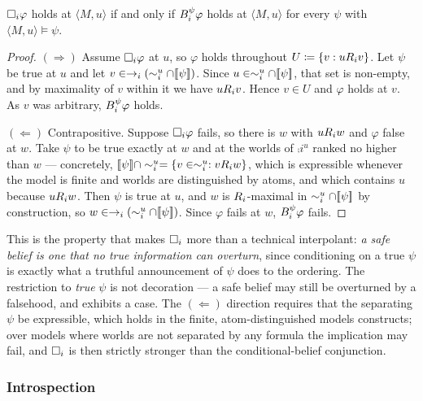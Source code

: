 \documentclass[11pt,a4paper]{article}
\begin{document}
\begin{proposition}
\label{prop:defeasible}
$\Box_{i}\varphi$ holds at $\langle M,u\rangle$ if and only if $B^{\psi}_{i}\varphi$ holds
at $\langle M,u\rangle$ for every $\psi$ with $\langle M,u\rangle \models \psi$.
\end{proposition}

\begin{proof}
$(\Rightarrow)$ Assume $\Box_{i}\varphi$ at $u$, so $\varphi$ holds throughout $U \coloneqq
\{v : u R_{i} v\}$. Let $\psi$ be true at $u$ and let $v \in
\rightarrow_{i}(\sim_{i}^{u} \cap [\![ \psi ]\!])$. Since $u \in \sim_{i}^{u} \cap [\![ \psi ]\!]$,
that set is non-empty, and by maximality of $v$ within it we have $u R_{i} v$. Hence $v
\in U$ and $\varphi$ holds at $v$. As $v$ was arbitrary, $B^{\psi}_{i}\varphi$ holds.

$(\Leftarrow)$ Contrapositive. Suppose $\Box_{i}\varphi$ fails, so there is $w$ with $u
R_{i} w$ and $\varphi$ false at $w$. Take $\psi$ to be true exactly at $w$ and at the
worlds of $\comp{i}^{u}$ ranked no higher than $w$ --- concretely, $[\![ \psi ]\!] \cap
\sim_{i}^{u} = \{v \in \sim_{i}^{u} : v R_{i} w\}$, which is expressible whenever the
model is finite and worlds are distinguished by atoms, and which contains $u$ because $u
R_{i} w$. Then $\psi$ is true at $u$, and $w$ is $R_{i}$-maximal in $\sim_{i}^{u}
\cap [\![ \psi ]\!]$ by construction, so $w \in \rightarrow_{i}(\sim_{i}^{u} \cap [\![ \psi ]\!])$.
Since $\varphi$ fails at $w$, $B^{\psi}_{i}\varphi$ fails.
\end{proof}

\begin{remark}
This is the property that makes $\Box_{i}$ more than a technical interpolant: \emph{a safe
belief is one that no true information can overturn}, since conditioning on a true $\psi$ is
exactly what a truthful announcement of $\psi$ does to the ordering. The restriction to
\emph{true} $\psi$ is not decoration --- a safe belief may still be overturned by a
falsehood, and  exhibits a case. The $(\Leftarrow)$ direction requires
that the separating $\psi$ be expressible, which holds in the finite, atom-distinguished
models \delhi{} constructs; over models where worlds are not separated by any formula the
implication may fail, and $\Box_{i}$ is then strictly stronger than the conditional-belief
conjunction.
\end{remark}

\subsubsection{Introspection}
\label{sec:introspect}
\end{document}
